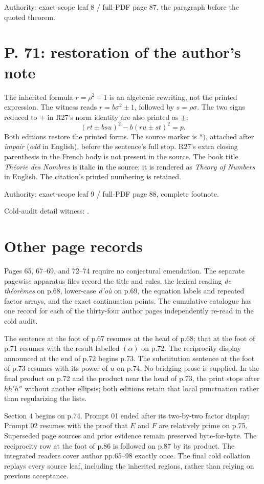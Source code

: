 \documentclass[11pt]{article}
\begin{document}
Authority: exact-scope leaf 8 / full-PDF page 87, the paragraph before the quoted theorem.

\newpage
\section*{P. 71: restoration of the author’s note}
The inherited formula $r=\rho^2\mp1$ is an algebraic rewriting, not the printed
expression. The witness reads $r=b\sigma^2\pm1$, followed by $s=\rho\sigma$.
The two signs reduced to $+$ in R27’s norm identity are also printed as $\pm$:
\[
(rt\pm bsu)^2-b(ru\pm st)^2=p.
\]
Both editions restore the printed forms. The source marker is $*)$, attached after
\emph{impair} (\emph{odd} in English), before the sentence’s full stop. R27’s extra
closing parenthesis in the French body is not present in the source. The book title
\emph{Théorie des Nombres} is italic in the source; it is rendered as
\emph{Theory of Numbers} in English. The citation’s printed numbering is retained.

Authority: exact-scope leaf 9 / full-PDF page 88, complete footnote.

Cold-audit detail witness: .

\section*{Other page records}
Pages 65, 67–69, and 72–74 require no conjectural emendation. The separate pagewise
apparatus files record the title and rules, the lexical reading \emph{de théorèmes}
on p.68, lower-case \emph{d’où} on p.69, the equation labels and repeated factor
arrays, and the exact continuation points. The cumulative catalogue has one record for each
of the thirty-four author pages independently re-read in the cold audit.

The sentence at the foot of p.67 resumes at the head of p.68; that at the foot of
p.71 resumes with the result labelled $(\alpha)$ on p.72. The reciprocity display
announced at the end of p.72 begins p.73. The substitution sentence at the foot of
p.73 resumes with its power of $u$ on p.74. No bridging prose is supplied. In the final product on p.72 and the product
near the head of p.73, the print stops after $hh'h''$ without another ellipsis;
both editions retain that local punctuation rather than regularizing the lists.

Section 4 begins on p.74. Prompt 01 ended after its two-by-two factor display;
Prompt 02 resumes with the proof that $E$ and $F$ are relatively prime on p.75.
Superseded page sources and prior evidence remain preserved byte-for-byte. The reciprocity row at the foot
of p.86 is followed on p.87 by its product. The integrated readers cover author
pp.65–98 exactly once. The final cold collation replays every source leaf,
including the inherited regions, rather than relying on previous acceptance.
\end{document}
